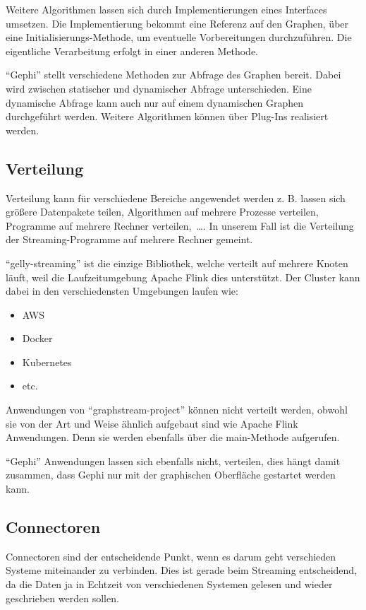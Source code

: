 Weitere Algorithmen lassen sich durch Implementierungen eines Interfaces umsetzen.
Die Implementierung bekommt eine Referenz auf den Graphen, über eine
Initialisierungs-Methode, um eventuelle Vorbereitungen durchzuführen. Die
eigentliche Verarbeitung erfolgt in einer anderen Methode.

\enquote{Gephi} stellt verschiedene Methoden zur Abfrage des Graphen bereit.
Dabei wird zwischen statischer und dynamischer Abfrage unterschieden. Eine
dynamische Abfrage kann auch nur auf einem dynamischen Graphen durchgeführt
werden. Weitere Algorithmen können über Plug-Ins realisiert werden.

\subsection{Verteilung}
Verteilung kann für verschiedene Bereiche angewendet werden z. B. lassen sich
größere Datenpakete teilen, Algorithmen auf mehrere Prozesse verteilen, Programme
auf mehrere Rechner verteilen,~\dots . In unserem Fall ist die Verteilung der
Streaming-Programme auf mehrere Rechner gemeint.

\enquote{gelly-streaming} ist die einzige Bibliothek, welche verteilt auf mehrere
Knoten läuft, weil die Laufzeitumgebung Apache Flink dies unterstützt.
Der Cluster kann dabei in den verschiedensten Umgebungen laufen wie: \parencite{Foundation2018}

\begin{itemize}
    \item AWS
    \item Docker
    \item Kubernetes
    \item etc.
\end{itemize}

Anwendungen von \enquote{graphstream-project} können nicht verteilt werden,
obwohl sie von der Art und Weise ähnlich aufgebaut sind wie Apache Flink
Anwendungen. Denn sie werden ebenfalls über die main-Methode aufgerufen.

\enquote{Gephi} Anwendungen lassen sich ebenfalls nicht, verteilen, dies hängt
damit zusammen, dass Gephi nur mit der graphischen Oberfläche gestartet werden
kann.

\subsection{Connectoren}
Connectoren sind der entscheidende Punkt, wenn es darum geht verschieden Systeme
miteinander zu verbinden. Dies ist gerade beim Streaming entscheidend, da die
Daten ja in Echtzeit von verschiedenen Systemen gelesen und wieder geschrieben
werden sollen.

